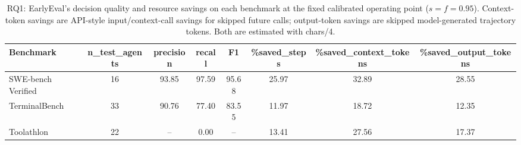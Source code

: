 \begin{table}[t]
\centering
\caption{RQ1: EarlyEval's decision quality and resource savings on each benchmark at the fixed calibrated operating point ($s=f=0.95$). Context-token savings are API-style input/context-call savings for skipped future calls; output-token savings are skipped model-generated trajectory tokens. Both are estimated with chars/4.}
\label{tab:rq1}
\small
\setlength{\tabcolsep}{4.5pt}
\begin{tabular}{l c c c c c c c}
\toprule
\textbf{Benchmark} & \textbf{n\_test\_agents} & \textbf{precision} & \textbf{recall} & \textbf{F1} & \textbf{\%saved\_steps} & \textbf{\%saved\_context\_tokens} & \textbf{\%saved\_output\_tokens} \\
\midrule
SWE-bench Verified & 16 & 93.85 & 97.59 & 95.68 & 25.97 & 32.89 & 28.55 \\
TerminalBench & 33 & 90.76 & 77.40 & 83.55 & 11.97 & 18.72 & 12.35 \\
Toolathlon & 22 & -- & 0.00 & -- & 13.41 & 27.56 & 17.37 \\
\bottomrule
\end{tabular}
\end{table}

